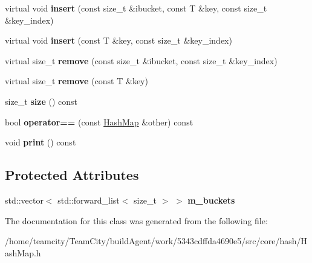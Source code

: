 \begin{DoxyCompactItemize}
\item 
virtual void {\bfseries insert} (const size\+\_\+t \&ibucket, const T \&key, const size\+\_\+t \&key\+\_\+index)\hypertarget{classHashMap_aab21199d4692865f989168a2bf02b7e9}{}\label{classHashMap_aab21199d4692865f989168a2bf02b7e9}

\item 
virtual void {\bfseries insert} (const T \&key, const size\+\_\+t \&key\+\_\+index)\hypertarget{classHashMap_a2e75f0e3ffc44c9b4d5821e36756395a}{}\label{classHashMap_a2e75f0e3ffc44c9b4d5821e36756395a}

\item 
virtual size\+\_\+t {\bfseries remove} (const size\+\_\+t \&ibucket, const size\+\_\+t \&key\+\_\+index)\hypertarget{classHashMap_aeb1bfd294550522d4b99cb1fc5855981}{}\label{classHashMap_aeb1bfd294550522d4b99cb1fc5855981}

\item 
virtual size\+\_\+t {\bfseries remove} (const T \&key)\hypertarget{classHashMap_a37060379e724337f2b42cf185f34fdc9}{}\label{classHashMap_a37060379e724337f2b42cf185f34fdc9}

\item 
size\+\_\+t {\bfseries size} () const \hypertarget{classHashMap_a0649c3b72405bfef706d98e281df4bf7}{}\label{classHashMap_a0649c3b72405bfef706d98e281df4bf7}

\item 
bool {\bfseries operator==} (const \hyperlink{classHashMap}{Hash\+Map} \&other) const \hypertarget{classHashMap_a7601c385de515579179c5ad40b2f5865}{}\label{classHashMap_a7601c385de515579179c5ad40b2f5865}

\item 
void {\bfseries print} () const \hypertarget{classHashMap_a805dc87c2829ce7b657ced9f0fa0f958}{}\label{classHashMap_a805dc87c2829ce7b657ced9f0fa0f958}

\end{DoxyCompactItemize}
\subsection*{Protected Attributes}
\begin{DoxyCompactItemize}
\item 
std\+::vector$<$ std\+::forward\+\_\+list$<$ size\+\_\+t $>$ $>$ {\bfseries m\+\_\+buckets}\hypertarget{classHashMap_a962a721172bfc7ec504c756e906b3af4}{}\label{classHashMap_a962a721172bfc7ec504c756e906b3af4}

\end{DoxyCompactItemize}


The documentation for this class was generated from the following file\+:\begin{DoxyCompactItemize}
\item 
/home/teamcity/\+Team\+City/build\+Agent/work/5343cdffda4690e5/src/core/hash/Hash\+Map.\+h\end{DoxyCompactItemize}
